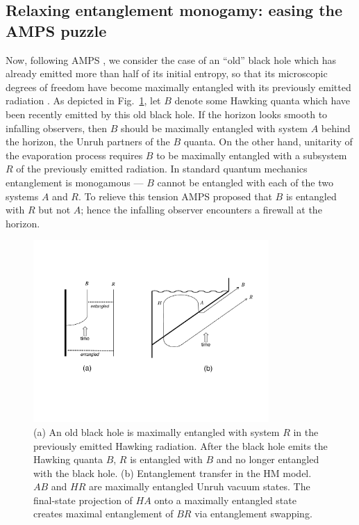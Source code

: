 \documentclass[11pt]{article}
\begin{document}
\subsection{Relaxing entanglement monogamy: easing the AMPS puzzle}

Now, following AMPS \cite{amps,ampss}, we consider the case of an ``old''  black hole which has already emitted more than half of its initial entropy, so that its microscopic degrees of freedom have become maximally entangled with its previously emitted radiation \cite{page}. As depicted in Fig.~\ref{fig:transfer}, let $B$ denote some Hawking quanta which have been recently emitted by this old black hole. If the horizon looks smooth to infalling observers, then $B$ should be maximally entangled with system $A$ behind the horizon, the Unruh partners of the $B$ quanta. On the other hand, unitarity of the evaporation process requires $B$ to be maximally entangled with a subsystem $R$ of the previously emitted radiation. In standard quantum mechanics entanglement is monogamous --- $B$ cannot be entangled with each of the two systems $A$ and $R$. To relieve this tension AMPS proposed that $B$ is entangled with $R$ but not $A$; hence the infalling observer encounters a firewall at the horizon. 

\begin{figure}[t]
\begin{center}
\includegraphics[width=0.8\textwidth]{transfer.pdf}
\end{center}
\caption{(a) An old black hole is maximally entangled with system $R$ in the previously emitted Hawking radiation. After the black hole emits the Hawking quanta $B$, $R$ is entangled with $B$ and no longer entangled with the black hole. (b) Entanglement transfer in the HM model. $AB$ and $HR$ are maximally entangled Unruh vacuum states. The final-state projection of $HA$ onto a maximally entangled state creates maximal entanglement of $BR$ via entanglement swapping.}
\label{fig:transfer}
\end{figure}
\end{document}
